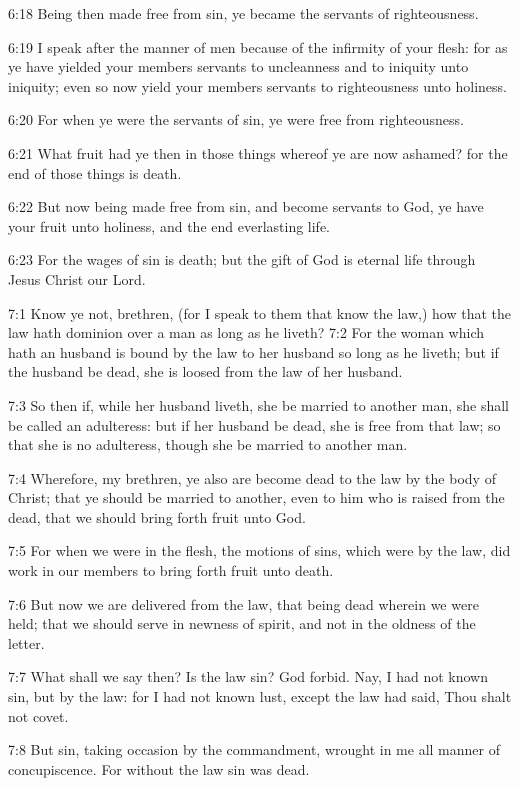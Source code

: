 6:18 Being then made free from sin, ye became the servants of righteousness.

6:19 I speak after the manner of men because of the infirmity of your flesh: for as ye have yielded your members servants to uncleanness and to iniquity unto iniquity; even so now yield your members servants to righteousness unto holiness.

6:20 For when ye were the servants of sin, ye were free from righteousness.

6:21 What fruit had ye then in those things whereof ye are now ashamed?  for the end of those things is death.

6:22 But now being made free from sin, and become servants to God, ye have your fruit unto holiness, and the end everlasting life.

6:23 For the wages of sin is death; but the gift of God is eternal life through Jesus Christ our Lord.

7:1 Know ye not, brethren, (for I speak to them that know the law,) how that the law hath dominion over a man as long as he liveth?  7:2 For the woman which hath an husband is bound by the law to her husband so long as he liveth; but if the husband be dead, she is loosed from the law of her husband.

7:3 So then if, while her husband liveth, she be married to another man, she shall be called an adulteress: but if her husband be dead, she is free from that law; so that she is no adulteress, though she be married to another man.

7:4 Wherefore, my brethren, ye also are become dead to the law by the body of Christ; that ye should be married to another, even to him who is raised from the dead, that we should bring forth fruit unto God.

7:5 For when we were in the flesh, the motions of sins, which were by the law, did work in our members to bring forth fruit unto death.

7:6 But now we are delivered from the law, that being dead wherein we were held; that we should serve in newness of spirit, and not in the oldness of the letter.

7:7 What shall we say then? Is the law sin? God forbid. Nay, I had not known sin, but by the law: for I had not known lust, except the law had said, Thou shalt not covet.

7:8 But sin, taking occasion by the commandment, wrought in me all manner of concupiscence. For without the law sin was dead.

